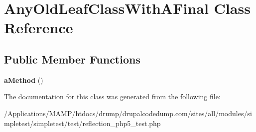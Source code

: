 \hypertarget{class_any_old_leaf_class_with_a_final}{
\section{AnyOldLeafClassWithAFinal Class Reference}
\label{class_any_old_leaf_class_with_a_final}
}
\subsection*{Public Member Functions}
\begin{DoxyCompactItemize}
\item 
\hypertarget{class_any_old_leaf_class_with_a_final_a58ed0f9ebb07261dfe7d7a4b5cb29665}{
{\bfseries aMethod} ()}
\label{class_any_old_leaf_class_with_a_final_a58ed0f9ebb07261dfe7d7a4b5cb29665}

\end{DoxyCompactItemize}


The documentation for this class was generated from the following file:\begin{DoxyCompactItemize}
\item 
/Applications/MAMP/htdocs/drump/drupalcodedump.com/sites/all/modules/simpletest/simpletest/test/reflection\_\-php5\_\-test.php\end{DoxyCompactItemize}
